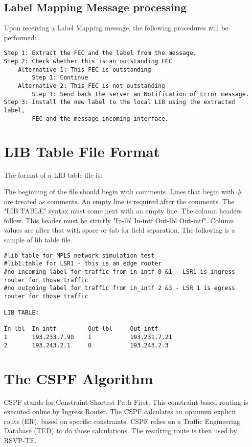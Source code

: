 \subsection{Label Mapping Message processing}

Upon receiving a Label Mapping message, the following procedures will be
performed:

\begin{verbatim}
Step 1: Extract the FEC and the label from the message.
Step 2: Check whether this is an outstanding FEC
    Alternative 1: This FEC is outstanding
        Step 1: Continue
    Alternative 2: This FEC is not outstanding
        Step 1: Send back the server an Notification of Error message.
Step 3: Install the new label to the local LIB using the extracted label,
        FEC and the message incoming interface.
\end{verbatim}


\section{LIB Table File Format}

The format of a LIB table file is:

The beginning of the file should begin with comments. Lines that begin with \# are treated
as comments. An empty line is required after the comments. The "LIB TABLE"
syntax must come next with an empty line. The column headers follow. This header
must be strictly "In-lbl In-intf Out-lbl Out-intf". Column
values are after that with space or tab for field separation.
The following is a sample of lib table file.

\begin{verbatim}
#lib table for MPLS network simulation test
#lib1.table for LSR1 - this is an edge router
#no incoming label for traffic from in-intf 0 &1 - LSR1 is ingress router for those traffic
#no outgoing label for traffic from in_intf 2 &3 - LSR 1 is egress router for those traffic

LIB TABLE:

In-lbl  In-intf         Out-lbl     Out-intf
1       193.233.7.90    1           193.231.7.21
2       193.243.2.1     0           193.243.2.3
\end{verbatim}

\section{The CSPF Algorithm}

CSPF stands for Constraint Shortest Path First.
This constraint-based routing is executed online by Ingress Router.
The CSPF calculates an optimum explicit route (ER), based on
specific constraints. CSPF relies on a Traffic Engineering Database (TED)
to do those calculations. The resulting route is then used by RSVP-TE.

